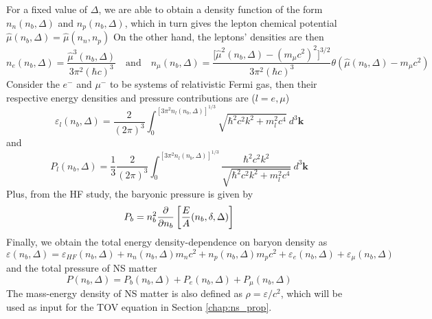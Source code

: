 For a fixed value of $\Delta$, we are able to obtain a density function of the form $n_n (n_b, \Delta)$ and $n_p (n_b, \Delta)$, which in turn gives the lepton chemical potential $\hat{\mu}(n_b,\Delta) = \hat{\mu}(n_n,n_p)$ On the other hand, the leptons' densities are then
\begin{equation}
        n_e(n_b,\Delta) = \frac{ \hat{\mu}^3(n_b,\Delta)}{ 3\pi^2 (\hbar c)^3} \quad\text{and}\quad n_\mu(n_b,\Delta) = \frac{ \Big[\hat{\mu}^2(n_b,\Delta) - (m_\mu c^2)^2\Big]^{3/2}}{ 3\pi^2 (\hbar c)^3} \theta(\hat{\mu}(n_b,\Delta)-m_\mu c^2)
\end{equation} 
Consider the $e^-$ and $\mu^-$ to be systems of relativistic Fermi gas, then their respective energy densities and pressure contributions are ($l=e,\mu$) \citep{moustakidis2009equation}
\begin{equation}
        \varepsilon_l(n_b,\Delta) = \frac{ 2}{ (2\pi)^3} \int_{{0}}^{{[3\pi^2n_l(n_b,\Delta)]^{1/3}}} {\sqrt{\hbar^2 c^2 k^2 + m_l^2 c^4}} \: d^3{\mathbf{k}}
\end{equation} 
and
\begin{equation}
        P_l(n_b,\Delta) = \frac{ 1}{ 3} \frac{ 2}{ (2\pi)^3} \int_{{0}}^{{[3\pi^2 n_l(n_b,\Delta)]^{1/3}}} { \frac{ \hbar^2 c^2 k^2}{ \sqrt{\hbar^2 c^2 k^2 + m_l^2 c^4}} } \: d^3{\mathbf{k}}
\end{equation} 
Plus, from the \gls{HF} study, the baryonic pressure is given by
\begin{equation}
    P_b = n_b^2 \pdv{}{n_b} \left[ \frac{E}{A}(n_b,\delta,\Delta) \right]
\end{equation}
Finally, we obtain the total energy density-dependence on baryon density as 
\begin{equation}
        \varepsilon(n_b,\Delta) = \varepsilon_{HF}(n_b,\Delta) + n_n(n_b,\Delta)m_n c^2 + n_p(n_b,\Delta)m_p c^2 + \varepsilon_e(n_b,\Delta) + \varepsilon_\mu(n_b,\Delta)
\end{equation}
and the total pressure of \gls{NS} matter
\begin{equation}
        P(n_b,\Delta) = P_b(n_b,\Delta) + P_e(n_b,\Delta) + P_\mu(n_b,\Delta)
\end{equation}
The mass-energy density of \gls{NS} matter is also defined as $\rho = \varepsilon/c^2$, which will be used as input for the \gls{TOV} equation in Section \ref{chap:ns_prop}.

